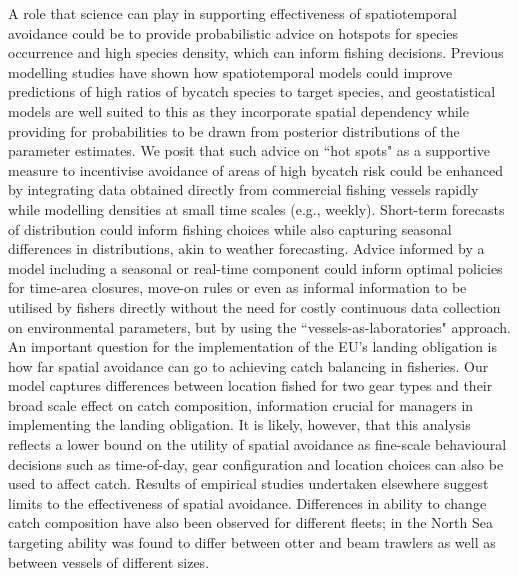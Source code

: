 \documentclass[fleqn,10pt]{wlscirep}
\begin{document}
\begin{linenumbers}
A role that science can play in supporting effectiveness of spatiotemporal
avoidance could be to provide probabilistic advice on hotspots for species
occurrence and high species density, which can inform fishing decisions.
Previous modelling studies have shown how spatiotemporal models could improve
predictions of high ratios of bycatch species to target species\cite{Ward2015,
	Cosandey-Godin2015, Breivik2016}, and geostatistical models are well
suited to this as they incorporate spatial dependency while providing for
probabilities to be drawn from posterior distributions of the parameter
estimates. We posit that such advice on ``hot spots" as a supportive measure to
incentivise avoidance of areas of high bycatch risk could be enhanced by
integrating data obtained directly from commercial fishing vessels rapidly
while modelling densities at small time scales (e.g., weekly). Short-term
forecasts of distribution could inform fishing choices while also capturing
seasonal differences in distributions, akin to weather forecasting.  Advice
informed by a model including a seasonal or real-time component could inform
optimal policies for time-area closures, move-on rules or even as informal
information to be utilised by fishers directly without the need for costly
continuous data collection on environmental parameters, but by using the
``vessels-as-laboratories" approach.\\

An important question for the implementation of the EU's landing obligation is
how far spatial avoidance can go to achieving catch balancing in fisheries.
Our model captures differences between location fished for two gear types and
their broad scale effect on catch composition, information crucial for managers
in implementing the landing obligation. It is likely, however, that this
analysis reflects a lower bound on the utility of spatial avoidance as
fine-scale behavioural decisions such as time-of-day, gear configuration and
location choices can also be used to affect catch\cite{Abbott2015,
	Thorson2016}. Results of empirical studies undertaken
elsewhere\cite{Branch2008, Kuriyama2016} suggest limits to the effectiveness of
spatial avoidance. Differences in ability to change catch composition have also
been observed for different fleets; in the North Sea targeting ability was
found to differ between otter and beam trawlers as well as between vessels of
different sizes\cite{Pascoe2007}. \\


\end{linenumbers}
\end{document}
